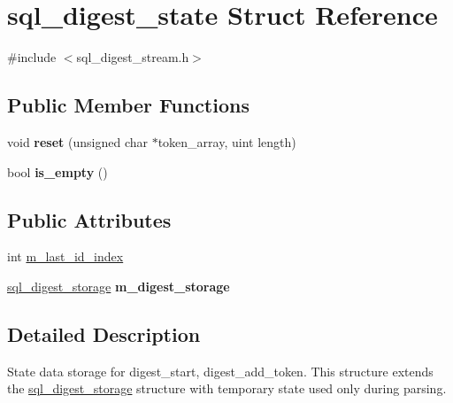 \hypertarget{structsql__digest__state}{}\section{sql\+\_\+digest\+\_\+state Struct Reference}
\label{structsql__digest__state}


{\ttfamily \#include $<$sql\+\_\+digest\+\_\+stream.\+h$>$}

\subsection*{Public Member Functions}
\begin{DoxyCompactItemize}
\item 
\mbox{\label{structsql__digest__state_a862f291fee25477262c277602242be91}} 
void {\bfseries reset} (unsigned char $\ast$token\+\_\+array, uint length)
\item 
\mbox{\label{structsql__digest__state_a14b732c508a3eee659ba69943b42b09a}} 
bool {\bfseries is\+\_\+empty} ()
\end{DoxyCompactItemize}
\subsection*{Public Attributes}
\begin{DoxyCompactItemize}
\item 
int \mbox{\hyperlink{structsql__digest__state_ae16b2c8bbc75b4de6a3a98bf5ec9a6d6}{m\+\_\+last\+\_\+id\+\_\+index}}
\item 
\mbox{\label{structsql__digest__state_a258b682ae8da0ac28bd00c66e770bd3f}} 
\mbox{\hyperlink{structsql__digest__storage}{sql\+\_\+digest\+\_\+storage}} {\bfseries m\+\_\+digest\+\_\+storage}
\end{DoxyCompactItemize}


\subsection{Detailed Description}
State data storage for {\ttfamily digest\+\_\+start}, {\ttfamily digest\+\_\+add\+\_\+token}. This structure extends the {\ttfamily \mbox{\hyperlink{structsql__digest__storage}{sql\+\_\+digest\+\_\+storage}}} structure with temporary state used only during parsing. 

